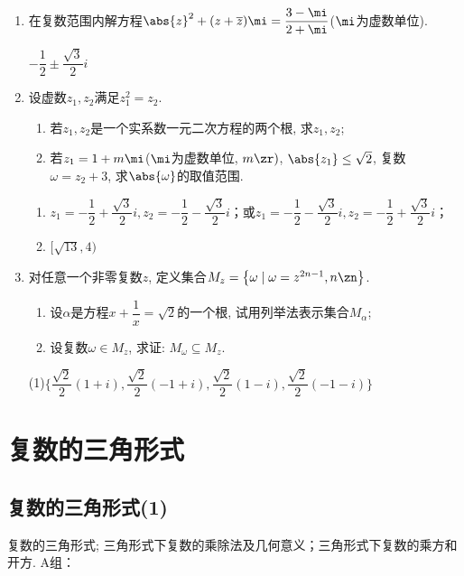 \begin{enumerate}
\item 在复数范围内解方程$\abs{z}^2+(z+\overline{z})\mi=\dfrac{3-\mi}{2+\mi}$($\mi$为虚数单位).
\begin{jieda}
    $-\dfrac{1}{2}\pm \dfrac{\sqrt{3}}{2}i$
\end{jieda}

\item 设虚数$z_1,z_2 $满足$z_1^2=z_2$.
\begin{enumerate}[(1)]
\item 若$z_1,z_2$是一个实系数一元二次方程的两个根, 求$z_1,z_2$; 
\item 若$z_1=1+m\mi$($\mi$为虚数单位, $m\zr)$, $\abs{z_1}\leq\sqrt{2}$, 复数$\omega=z_2+3$, 求$\abs{\omega}$的取值范围.
\end{enumerate}
\begin{jieda}
\begin{enumerate}

    \item $z_1=-\dfrac{1}{2}+ \dfrac{\sqrt{3}}{2}i,z_2=-\dfrac{1}{2}-\dfrac{\sqrt{3}}{2}i$；或$z_1=-\dfrac{1}{2}-\dfrac{\sqrt{3}}{2}i,z_2=-\dfrac{1}{2}+\dfrac{\sqrt{3}}{2}i$；
    \item $[\sqrt{13},4)$

\end{enumerate}
\end{jieda}

\item 对任意一个非零复数$z$, 定义集合$M_z=\left\{\omega\mid\omega=z^{2n-1}, n\zn\right\}$. 
\begin{enumerate}[(1)]
\item 设$\alpha$是方程$x+\dfrac{1}{x}=\sqrt{2}$的一个根, 试用列举法表示集合$M_\alpha$; 
\item 设复数$\omega\in M_z$, 求证: $M_\omega\subseteq M_z$.
\end{enumerate}
\begin{jieda}
    (1)$\{\dfrac{\sqrt{2}}{2}(1+i),\dfrac{\sqrt{2}}{2}(-1+i),\dfrac{\sqrt{2}}{2}(1-i),\dfrac{\sqrt{2}}{2}(-1-i)\}$

\end{jieda}

\end{enumerate}


\section{复数的三角形式}
\subsection{复数的三角形式(1)}
\zsd 复数的三角形式; 三角形式下复数的乘除法及几何意义；三角形式下复数的乘方和开方.
A组：

